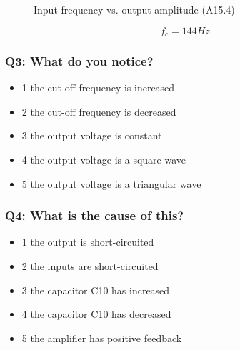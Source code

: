 \begin{figure}[H]
    \centering
    \caption{Input frequency vs. output amplitude (A15.4)}
    \label{fig:A15.4_graph}
\end{figure}
$$ f_c = 144Hz $$
\subsubsection{Q3: What do you notice?}
\begin{itemize}
    \item[\textendash] 1 the cut-off frequency is increased
    \item[\textendash] 2 the cut-off frequency is decreased
    \item[\textendash] 3 the output voltage is constant
    \item[\textendash] 4 the output voltage is a square wave
    \item[\textendash] 5 the output voltage is a triangular wave
\end{itemize}

\subsubsection{Q4: What is the cause of this?}
\begin{itemize}
    \item[\textendash] 1 the output is short-circuited
    \item[\textendash] 2 the inputs are short-circuited
    \item[\textendash] 3 the capacitor C10 has increased
    \item[\textendash] 4 the capacitor C10 has decreased
    \item[\textendash] 5 the amplifier has positive feedback
\end{itemize}
